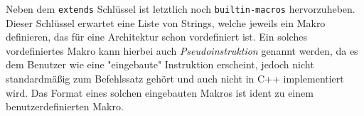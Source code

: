 Neben dem \texttt{extends} Schlüssel ist letztlich noch \texttt{builtin-macros}
hervorzuheben. Dieser Schlüssel erwartet eine Liste von Strings, welche jeweils
ein Makro definieren, das für eine Architektur schon vordefiniert ist. Ein
solches vordefiniertes Makro kann hierbei auch \emph{Pseudoinstruktion} genannt
werden, da es dem Benutzer wie eine "eingebaute" Instruktion erscheint, jedoch
nicht standardmäßig zum Befehlssatz gehört und auch nicht in C++ implementiert
wird. Das Format eines solchen eingebauten Makros ist ident zu einem benutzerdefinierten Makro.
